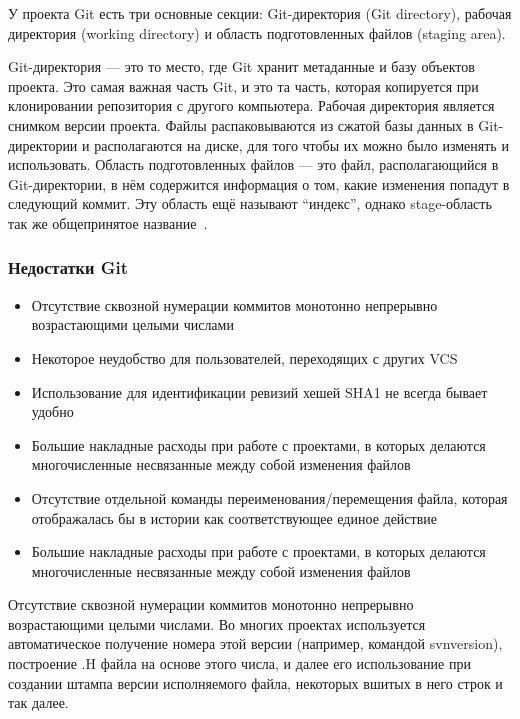 \documentclass{../industrial-development}
\begin{document}
\lecturenotes

У проекта Git есть три основные секции: Git-директория (Git directory), рабочая директория (working directory) и область подготовленных файлов (staging area).

Git-директория --- это то место, где Git хранит метаданные и базу объектов проекта. Это самая важная часть Git, и это та часть, которая копируется при клонировании репозитория с другого компьютера.
Рабочая директория является снимком версии проекта. Файлы распаковываются из сжатой базы данных в Git-директории и располагаются на диске, для того чтобы их можно было изменять и использовать.
Область подготовленных файлов — это файл, располагающийся в Git-директории, в нём содержится информация о том, какие изменения попадут в следующий коммит. Эту область ещё называют “индекс”, однако stage-область так же общепринятое название~\cite[с.~11]{ProGit}.

\begin{frame} \frametitle{Недостатки Git}
  
  \begin{itemize}
  \item Отсутствие сквозной нумерации коммитов монотонно непрерывно возрастающими целыми числами
  \item Некоторое неудобство для пользователей, переходящих с других VCS
  \item Использование для идентификации ревизий хешей SHA1 не всегда бывает удобно
  \item Большие накладные расходы при работе с проектами, в которых делаются многочисленные несвязанные между собой изменения файлов
  \item Отсутствие отдельной команды переименования/перемещения файла, которая отображалась бы в истории как соответствующее единое действие
  \item Большие накладные расходы при работе с проектами, в которых делаются многочисленные несвязанные между собой изменения файлов
  \end{itemize}
\end{frame}

\lecturenotes

Отсутствие сквозной нумерации коммитов монотонно непрерывно возрастающими целыми числами. Во многих проектах используется автоматическое получение номера этой версии (например, командой svnversion), построение .H файла на основе этого числа, и далее его использование при создании штампа версии исполняемого файла, некоторых вшитых в него строк и так далее.
\end{document}
